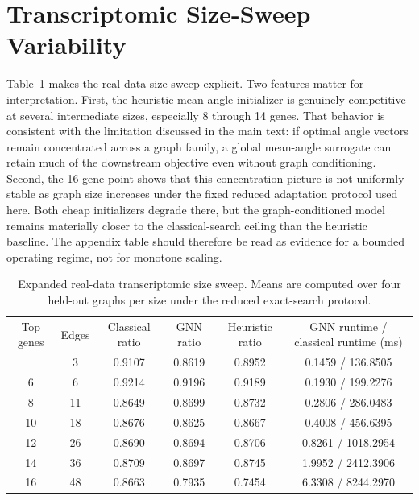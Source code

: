 \documentclass[
  reprint,
  twocolumn,
  aps,
  superscriptaddress,
  longbibliography,
  floatfix
]{revtex4-2}
\begin{document}
\section{Transcriptomic Size-Sweep Variability}
\label{app:size-sweep-variability}

Table~\ref{tab:qaoa-size-sweep-summary} makes the real-data size sweep explicit. Two features matter for interpretation. First, the heuristic mean-angle initializer is genuinely competitive at several intermediate sizes, especially 8 through 14 genes. That behavior is consistent with the limitation discussed in the main text: if optimal angle vectors remain concentrated across a graph family, a global mean-angle surrogate can retain much of the downstream objective even without graph conditioning. Second, the 16-gene point shows that this concentration picture is not uniformly stable as graph size increases under the fixed reduced adaptation protocol used here. Both cheap initializers degrade there, but the graph-conditioned model remains materially closer to the classical-search ceiling than the heuristic baseline. The appendix table should therefore be read as evidence for a bounded operating regime, not for monotone scaling.

\begin{table}[t]
\caption{Expanded real-data transcriptomic size sweep. Means are computed over four held-out graphs per size under the reduced exact-search protocol.}
\label{tab:qaoa-size-sweep-summary}
\begin{ruledtabular}
\begin{tabular}{cccccc}
Top genes & Edges & Classical ratio & GNN ratio & Heuristic ratio & GNN runtime / classical runtime (ms) \\
\colrule
4 & 3 & 0.9107 & 0.8619 & 0.8952 & 0.1459 / 136.8505 \\
6 & 6 & 0.9214 & 0.9196 & 0.9189 & 0.1930 / 199.2276 \\
8 & 11 & 0.8649 & 0.8699 & 0.8732 & 0.2806 / 286.0483 \\
10 & 18 & 0.8676 & 0.8625 & 0.8667 & 0.4008 / 456.6395 \\
12 & 26 & 0.8690 & 0.8694 & 0.8706 & 0.8261 / 1018.2954 \\
14 & 36 & 0.8709 & 0.8697 & 0.8745 & 1.9952 / 2412.3906 \\
16 & 48 & 0.8663 & 0.7935 & 0.7454 & 6.3308 / 8244.2970 \\
\end{tabular}
\end{ruledtabular}
\end{table}
\end{document}
